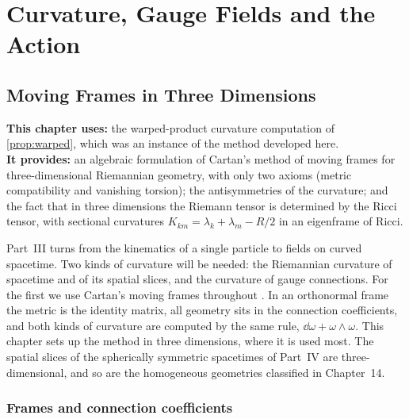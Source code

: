 \part{Curvature, Gauge Fields and the Action}

\chapter{Moving Frames in Three Dimensions}
\label{ch:frames}

\begin{usesbox}
\textbf{This chapter uses:} the warped-product curvature computation of \cref{prop:warped}, which was an instance of the method developed here.\\
\textbf{It provides:} an algebraic formulation of Cartan's method of moving frames for three-dimensional Riemannian geometry, with only two axioms (metric compatibility and vanishing torsion); the antisymmetries of the curvature; and the fact that in three dimensions the Riemann tensor is determined by the Ricci tensor, with sectional curvatures $K_{km}=\lambda_k+\lambda_m-R/2$ in an eigenframe of Ricci.
\end{usesbox}

Part~III turns from the kinematics of a single particle to fields on curved spacetime. Two kinds of curvature will be needed: the Riemannian curvature of spacetime and of its spatial slices, and the curvature of gauge connections. For the first we use Cartan's moving frames throughout \cite{Cartan,MTW}. In an orthonormal frame the metric is the identity matrix, all geometry sits in the connection coefficients, and both kinds of curvature are computed by the same rule, $\dd\omega+\omega\wedge\omega$. This chapter sets up the method in three dimensions, where it is used most. The spatial slices of the spherically symmetric spacetimes of Part~IV are three-dimensional, and so are the homogeneous geometries classified in Chapter~14.

\section{Frames and connection coefficients}

